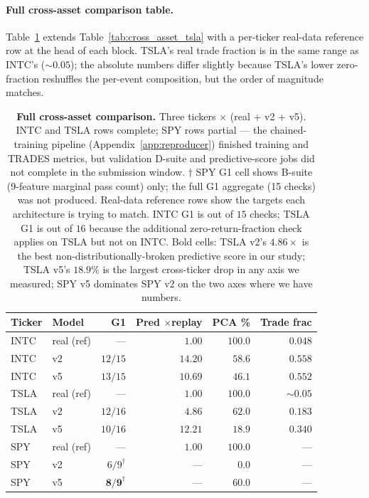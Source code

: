 \documentclass[journal]{IEEEtran}
\theoremstyle{definition}   %
\begin{document}
\paragraph{Full cross-asset comparison table.}
Table~\ref{tab:cross_asset_full} extends
Table~\ref{tab:cross_asset_tsla} with a per-ticker real-data
reference row at the head of each block. TSLA's real trade
fraction is in the same range as INTC's ($\sim 0.05$); the absolute
numbers differ slightly because TSLA's lower zero-fraction reshuffles
the per-event composition, but the order of magnitude matches.

\begin{table}[ht]
    \centering
    \footnotesize
    \begin{tabular}{llrrrr}
        \toprule
        Ticker & Model & G1 & Pred $\times$replay & PCA \% & Trade frac \\
        \midrule
        INTC   & real (ref) & --- & $1.00$ & $100.0$ & $0.048$ \\
        INTC   & v2 & $12/15$ & $14.20$        & $58.6$ & $0.558$ \\
        INTC   & v5 & $13/15$ & $10.69$        & $46.1$ & $0.552$ \\
        \midrule
        TSLA   & real (ref) & --- & $1.00$ & $100.0$ & $\sim 0.05$ \\
        TSLA   & v2 & $12/16$ & $\mathbf{4.86}$& $\mathbf{62.0}$ & $0.183$ \\
        TSLA   & v5 & $10/16$ & $12.21$        & $18.9$ & $0.340$ \\
        \midrule
        SPY    & real (ref) & --- & $1.00$ & $100.0$ & --- \\
        SPY    & v2 & $6/9^{\dagger}$ & --- & $0.0$ & --- \\
        SPY    & v5 & $\mathbf{8/9^{\dagger}}$ & --- & $\mathbf{60.0}$ & --- \\
        \bottomrule
    \end{tabular}
    \caption{\textbf{Full cross-asset comparison.} Three tickers
    $\times$ (real + v2 + v5). INTC and TSLA rows complete; SPY
    rows partial --- the chained-training pipeline
    (Appendix~\ref{app:reproducer}) finished training and TRADES
    metrics, but validation D-suite and predictive-score jobs did
    not complete in the submission window. ${\dagger}$ SPY G1 cell
    shows B-suite (9-feature marginal pass count) only; the full
    G1 aggregate (15 checks) was not produced. Real-data reference
    rows show the targets each architecture is trying to match.
    INTC G1 is out of $15$ checks; TSLA G1 is out of $16$ because
    the additional zero-return-fraction check applies on TSLA but
    not on INTC. Bold cells: TSLA v2's $4.86\times$ is the best
    non-distributionally-broken predictive score in our study;
    TSLA v5's $18.9\%$ is the largest cross-ticker drop in any
    axis we measured; SPY v5 dominates SPY v2 on the two axes
    where we have numbers.}
    \label{tab:cross_asset_full}
\end{table}
\end{document}
